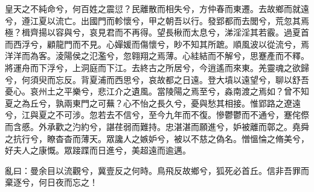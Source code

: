 
\begin{pinyinscope}
皇天之不純命兮，何百姓之震愆？民離散而相失兮，方仲春而東遷。去故鄉而就遠兮，遵江夏以流亡。出國門而軫懷兮，甲之朝吾以行。發郢都而去閭兮，荒忽其焉極？楫齊揚以容與兮，哀見君而不再得。望長楸而太息兮，涕淫淫其若霰。過夏首而西浮兮，顧龍門而不見。心嬋媛而傷懷兮，眇不知其所蹠。順風波以從流兮，焉洋洋而為客。淩陽侯之氾濫兮，忽翱翔之焉薄。心絓結而不解兮，思蹇產而不釋。將運舟而下浮兮，上洞庭而下江。去終古之所居兮，今逍遙而來東。羌靈魂之欲歸兮，何須臾而忘反。背夏浦而西思兮，哀故都之日遠。登大墳以遠望兮，聊以舒吾憂心。哀州土之平樂兮，悲江介之遺風。當陵陽之焉至兮，淼南渡之焉如？曾不知夏之為丘兮，孰兩東門之可蕪？心不怡之長久兮，憂與愁其相接。惟郢路之遼遠兮，江與夏之不可涉。忽若去不信兮，至今九年而不復。慘鬱鬱而不通兮，蹇侘傺而含慼。外承歡之汋約兮，諶荏弱而難持。忠湛湛而願進兮，妒被離而鄣之。堯舜之抗行兮，瞭杳杳而薄天。眾讒人之嫉妒兮，被以不慈之偽名。憎慍惀之脩美兮，好夫人之康慨。眾踥蹀而日進兮，美超遠而逾邁。

亂曰：曼余目以流觀兮，冀壹反之何時。鳥飛反故鄉兮，狐死必首丘。信非吾罪而棄逐兮，何日夜而忘之！


\end{pinyinscope}